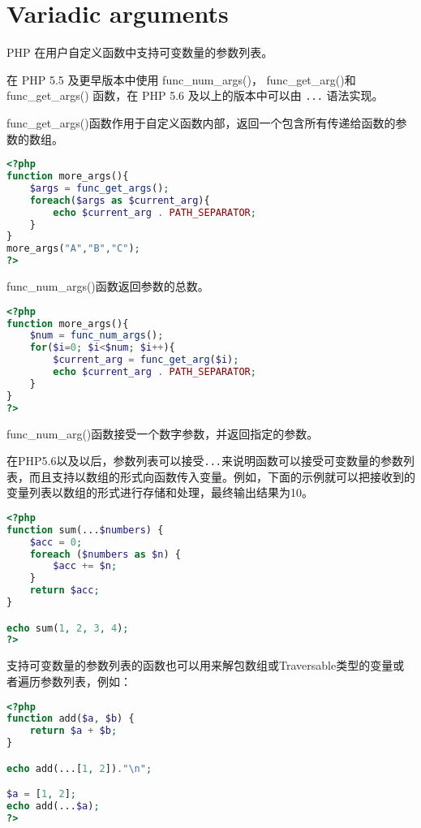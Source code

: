 \section{Variadic arguments}

PHP 在用户自定义函数中支持可变数量的参数列表。

在 PHP 5.5 及更早版本中使用 func\_num\_args()， func\_get\_arg()和 func\_get\_args() 函数，在 PHP 5.6 及以上的版本中可以由 \texttt{...} 语法实现。

\begin{compactitem}
\item func\_get\_args()函数作用于自定义函数内部，返回一个包含所有传递给函数的参数的数组。

\begin{lstlisting}[language=PHP]
<?php
function more_args(){
	$args = func_get_args();
	foreach($args as $current_arg){
		echo $current_arg . PATH_SEPARATOR;
	}
}
more_args("A","B","C");
?>
\end{lstlisting}

\item func\_num\_args()函数返回参数的总数。

\begin{lstlisting}[language=PHP]
<?php
function more_args(){
	$num = func_num_args();
	for($i=0; $i<$num; $i++){
		$current_arg = func_get_arg($i);
		echo $current_arg . PATH_SEPARATOR;
	}
}
?>
\end{lstlisting}


\item func\_num\_arg()函数接受一个数字参数，并返回指定的参数。

\end{compactitem}


在PHP5.6以及以后，参数列表可以接受\texttt{...}来说明函数可以接受可变数量的参数列表，而且支持以数组的形式向函数传入变量。例如，下面的示例就可以把接收到的变量列表以数组的形式进行存储和处理，最终输出结果为10。

\begin{lstlisting}[language=PHP]
<?php
function sum(...$numbers) {
    $acc = 0;
    foreach ($numbers as $n) {
        $acc += $n;
    }
    return $acc;
}

echo sum(1, 2, 3, 4);
?>
\end{lstlisting}

支持可变数量的参数列表的函数也可以用来解包数组或Traversable类型的变量或者遍历参数列表，例如：

\begin{lstlisting}[language=PHP]
<?php
function add($a, $b) {
    return $a + $b;
}

echo add(...[1, 2])."\n";

$a = [1, 2];
echo add(...$a);
?>
\end{lstlisting}

